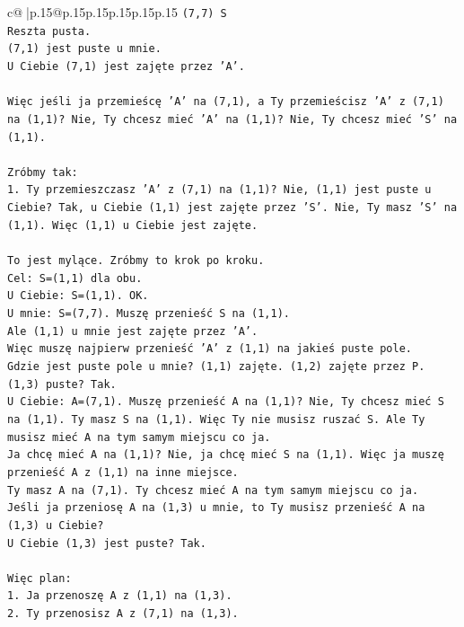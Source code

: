 \documentclass{article}
\begin{document}
{\begin{supertabular}{c@{$\;$}|p{.15\linewidth}@{}p{.15\linewidth}p{.15\linewidth}p{.15\linewidth}p{.15\linewidth}p{.15\linewidth}}
{{{\texttt{(7,7) S} \\
\texttt{Reszta pusta.} \\
\texttt{(7,1) jest puste u mnie.} \\
\texttt{U Ciebie (7,1) jest zajęte przez 'A'.} \\
\\ 
\texttt{Więc jeśli ja przemieścę 'A' na (7,1), a Ty przemieścisz 'A' z (7,1) na (1,1)? Nie, Ty chcesz mieć 'A' na (1,1)? Nie, Ty chcesz mieć 'S' na (1,1).} \\
\\ 
\texttt{Zróbmy tak:} \\
\texttt{1. Ty przemieszczasz 'A' z (7,1) na (1,1)? Nie, (1,1) jest puste u Ciebie? Tak, u Ciebie (1,1) jest zajęte przez 'S'. Nie, Ty masz 'S' na (1,1). Więc (1,1) u Ciebie jest zajęte.} \\
\\ 
\texttt{To jest mylące. Zróbmy to krok po kroku.} \\
\texttt{Cel: S=(1,1) dla obu.} \\
\texttt{U Ciebie: S=(1,1). OK.} \\
\texttt{U mnie: S=(7,7). Muszę przenieść S na (1,1).} \\
\texttt{Ale (1,1) u mnie jest zajęte przez 'A'.} \\
\texttt{Więc muszę najpierw przenieść 'A' z (1,1) na jakieś puste pole.} \\
\texttt{Gdzie jest puste pole u mnie? (1,1) zajęte. (1,2) zajęte przez P. (1,3) puste? Tak.} \\
\texttt{U Ciebie: A=(7,1). Muszę przenieść A na (1,1)? Nie, Ty chcesz mieć S na (1,1). Ty masz S na (1,1). Więc Ty nie musisz ruszać S. Ale Ty musisz mieć A na tym samym miejscu co ja.} \\
\texttt{Ja chcę mieć A na (1,1)? Nie, ja chcę mieć S na (1,1). Więc ja muszę przenieść A z (1,1) na inne miejsce.} \\
\texttt{Ty masz A na (7,1). Ty chcesz mieć A na tym samym miejscu co ja.} \\
\texttt{Jeśli ja przeniosę A na (1,3) u mnie, to Ty musisz przenieść A na (1,3) u Ciebie?} \\
\texttt{U Ciebie (1,3) jest puste? Tak.} \\
\\ 
\texttt{Więc plan:} \\
\texttt{1. Ja przenoszę A z (1,1) na (1,3).} \\
\texttt{2. Ty przenosisz A z (7,1) na (1,3).} \\
}}}
\end{supertabular}}
\end{document}
